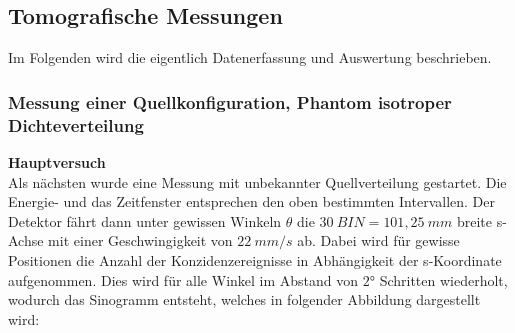     \subsection{Tomografische Messungen}
    Im Folgenden wird die eigentlich Datenerfassung und Auswertung beschrieben.
    	\subsubsection{Messung einer Quellkonfiguration, Phantom isotroper Dichteverteilung}
    	        \textbf{Hauptversuch}\\
    	        
    	        Als nächsten wurde eine Messung mit unbekannter Quellverteilung gestartet. Die Energie- und das Zeitfenster entsprechen den oben bestimmten Intervallen. Der Detektor fährt dann unter gewissen Winkeln $\theta$ die $30\ \unit{BIN} = 101,25\ \unit{mm}$ breite s-Achse mit einer Geschwingigkeit von $22\ \unit{mm/s}$ ab. Dabei wird für gewisse Positionen die Anzahl der Konzidenzereignisse in Abhängigkeit der s-Koordinate aufgenommen. Dies wird für alle Winkel im Abstand von $2\unit{°}$ Schritten wiederholt, wodurch das Sinogramm entsteht, welches in folgender Abbildung dargestellt wird:\\ 
    				
